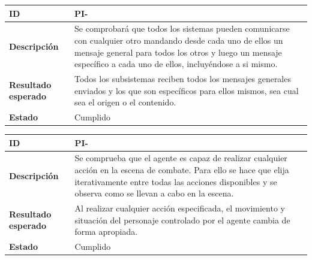 \setcounter{contador_pruebas_integracion}{1}

\begin{center}
	\begin{tabular}{ | p{3cm} | p{10cm} | } 
		\hline
		
		\textbf{ID} & PI-\arabic{contador_pruebas_integracion}
		{contador_pruebas_integracion} \\
	
		\hline
		\textbf{Descripción} & 
		Se comprobará que todos los sistemas pueden comunicarse con cualquier otro mandando desde cada uno de ellos un mensaje general para todos los otros y luego un mensaje específico a cada uno de ellos, incluyéndose a si mismo.\\
		
		\hline 
		\textbf{Resultado esperado} &
		Todos los subsistemas reciben todos los mensajes generales enviados y los que son específicos para ellos mismos, sea cual sea el origen o el contenido.\\
		
		\hline 
		\textbf{Estado} &
		Cumplido\\ 
		
		\hline
	\end{tabular}
\end{center}

\begin{center}
	\begin{tabular}{ | p{3cm} | p{10cm} | } 
		\hline
		
		\textbf{ID} & PI-\arabic{contador_pruebas_integracion}
		{contador_pruebas_integracion} \\
		
		\hline
		\textbf{Descripción} & 
		Se comprueba que el agente es capaz de realizar cualquier acción en la escena de combate. Para ello se hace que elija iterativamente entre todas las acciones disponibles y se observa como se llevan a cabo en la escena.\\
		
		\hline 
		\textbf{Resultado esperado} &
		Al realizar cualquier acción especificada, el movimiento y situación del personaje controlado por el agente cambia de forma apropiada.\\
		
		\hline 
		\textbf{Estado} &
		Cumplido\\ 
		
		\hline
	\end{tabular}
\end{center}

